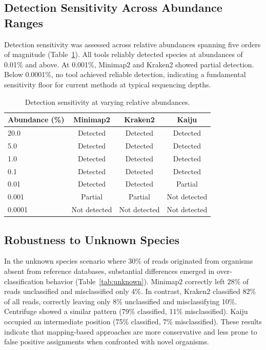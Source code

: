 \documentclass[11pt]{article}
\begin{document}
\subsection{Detection Sensitivity Across Abundance Ranges}

Detection sensitivity was assessed across relative abundances spanning five orders of magnitude (Table~\ref{tab:abundance}). All tools reliably detected species at abundances of 0.01\% and above. At 0.001\%, Minimap2 and Kraken2 showed partial detection. Below 0.0001\%, no tool achieved reliable detection, indicating a fundamental sensitivity floor for current methods at typical sequencing depths.

\begin{table}[ht]
\centering
\caption{Detection sensitivity at varying relative abundances.}
\label{tab:abundance}
\begin{tabular}{@{}lccc@{}}
\toprule
Abundance (\%) & Minimap2 & Kraken2 & Kaiju \\
\midrule
20.0 & Detected & Detected & Detected \\
5.0 & Detected & Detected & Detected \\
1.0 & Detected & Detected & Detected \\
0.1 & Detected & Detected & Detected \\
0.01 & Detected & Detected & Partial \\
0.001 & Partial & Partial & Not detected \\
0.0001 & Not detected & Not detected & Not detected \\
\bottomrule
\end{tabular}
\end{table}

\subsection{Robustness to Unknown Species}

In the unknown species scenario where 30\% of reads originated from organisms absent from reference databases, substantial differences emerged in over-classification behavior (Table~\ref{tab:unknown}). Minimap2 correctly left 28\% of reads unclassified and misclassified only 4\%. In contrast, Kraken2 classified 82\% of all reads, correctly leaving only 8\% unclassified and misclassifying 10\%. Centrifuge showed a similar pattern (79\% classified, 11\% misclassified). Kaiju occupied an intermediate position (75\% classified, 7\% misclassified). These results indicate that mapping-based approaches are more conservative and less prone to false positive assignments when confronted with novel organisms.
\end{document}
